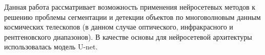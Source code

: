 \Annotation

Данная работа рассматривает возможность применения нейросетевых методов к решению проблемы 
сегментации и детекции объектов по многоволновым данным космических телескопов (в данном случае оптического, 
инфракрасного и рентгеновского диапазонов). В качестве основы для нейросетевой архитектуры использовалась модель 
U-net. %
